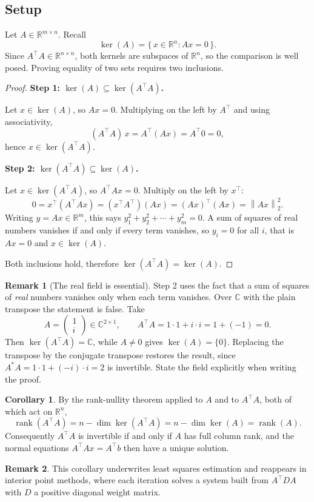 \documentclass[11pt]{article}
\DeclareMathOperator{\rank}{rank}
\theoremstyle{definition}
\newtheorem*{remark}{Remark}
\newtheorem*{corollary}{Corollary}
\begin{document}
\subsection*{Setup}

Let $A \in \mathbb{R}^{m \times n}$. Recall
\[
  \ker(A) = \{\, x \in \mathbb{R}^{n} : Ax = 0 \,\}.
\]
Since $A^{\top}\!A \in \mathbb{R}^{n \times n}$, both kernels are
subspaces of $\mathbb{R}^{n}$, so the comparison is well posed. Proving
equality of two sets requires two inclusions.

\begin{proof}
\textbf{Step 1: $\ker(A) \subseteq \ker(A^{\top}\!A)$.}

Let $x \in \ker(A)$, so $Ax = 0$. Multiplying on the left by $A^{\top}$
and using associativity,
\[
  (A^{\top}\!A)\,x = A^{\top}(Ax) = A^{\top} 0 = 0 ,
\]
hence $x \in \ker(A^{\top}\!A)$.

\medskip
\textbf{Step 2: $\ker(A^{\top}\!A) \subseteq \ker(A)$.}

Let $x \in \ker(A^{\top}\!A)$, so $A^{\top}\!A x = 0$. Multiply on the
left by $x^{\top}$:
\[
  0 = x^{\top}\!\left(A^{\top}\!A x\right)
    = \left(x^{\top} A^{\top}\right)(A x)
    = (Ax)^{\top}(Ax)
    = \left\| Ax \right\|_{2}^{2} .
\]
Writing $y = Ax \in \mathbb{R}^{m}$, this says
$y_1^2 + y_2^2 + \cdots + y_m^2 = 0$. A sum of squares of real numbers
vanishes if and only if every term vanishes, so $y_i = 0$ for all $i$,
that is $Ax = 0$ and $x \in \ker(A)$.

\medskip
Both inclusions hold, therefore $\ker(A^{\top}\!A) = \ker(A)$.
\end{proof}

\begin{remark}[The real field is essential]
Step 2 uses the fact that a sum of squares of \emph{real} numbers
vanishes only when each term vanishes. Over $\mathbb{C}$ with the plain
transpose the statement is false. Take
\[
  A = \begin{pmatrix} 1 \\ i \end{pmatrix} \in \mathbb{C}^{2 \times 1},
  \qquad
  A^{\top}\!A = 1 \cdot 1 + i \cdot i = 1 + (-1) = 0 .
\]
Then $\ker(A^{\top}\!A) = \mathbb{C}$, while $A \neq 0$ gives
$\ker(A) = \{0\}$. Replacing the transpose by the conjugate transpose
restores the result, since
$A^{*}A = 1 \cdot 1 + (-i)\cdot i = 2$ is invertible. State the field
explicitly when writing the proof.
\end{remark}

\begin{corollary}
By the rank-nullity theorem applied to $A$ and to $A^{\top}\!A$, both of
which act on $\mathbb{R}^{n}$,
\[
  \rank(A^{\top}\!A) = n - \dim \ker(A^{\top}\!A)
                     = n - \dim \ker(A)
                     = \rank(A).
\]
Consequently $A^{\top}\!A$ is invertible if and only if $A$ has full
column rank, and the normal equations $A^{\top}\!A x = A^{\top} b$ then
have a unique solution.
\end{corollary}

\begin{remark}
This corollary underwrites least squares estimation and reappears in
interior point methods, where each iteration solves a system built from
$A^{\top} D A$ with $D$ a positive diagonal weight matrix.
\end{remark}
\end{document}
